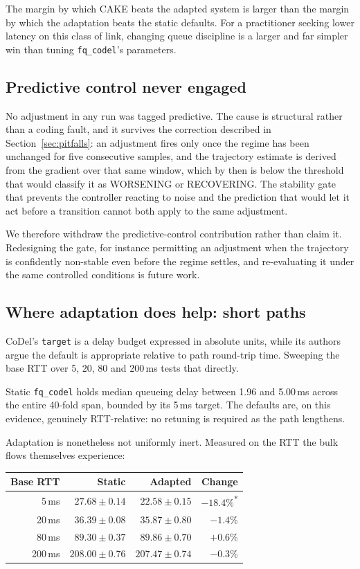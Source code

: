 The margin by which CAKE beats the adapted system is larger than the margin by
which the adaptation beats the static defaults. For a practitioner seeking
lower latency on this class of link, changing queue discipline is a larger and
far simpler win than tuning \texttt{fq\_codel}'s parameters.

\subsection{Predictive control never engaged}

No adjustment in any run was tagged predictive. The cause is structural rather
than a coding fault, and it survives the correction described in
Section~\ref{sec:pitfalls}: an adjustment fires only once the regime has been
unchanged for five consecutive samples, and the trajectory estimate is derived
from the gradient over that same window, which by then is below the threshold
that would classify it as WORSENING or RECOVERING. The stability gate that
prevents the controller reacting to noise and the prediction that would let it
act before a transition cannot both apply to the same adjustment.

We therefore withdraw the predictive-control contribution rather than claim it.
Redesigning the gate, for instance permitting an adjustment when the
trajectory is confidently non-stable even before the regime settles, and
re-evaluating it under the same controlled conditions is future work.

\subsection{Where adaptation does help: short paths}

CoDel's \texttt{target} is a delay budget expressed in absolute units, while
its authors argue the default is appropriate relative to path round-trip time.
Sweeping the base RTT over 5, 20, 80 and 200\,ms tests that directly.

Static \texttt{fq\_codel} holds median queueing delay between 1.96 and
5.00\,ms across the entire 40-fold span, bounded by its 5\,ms target. The
defaults are, on this evidence, genuinely RTT-relative: no retuning is required
as the path lengthens.

Adaptation is nonetheless not uniformly inert. Measured on the RTT the bulk
flows themselves experience:

\begin{center}
\begin{tabular}{rrrr}
\toprule
\textbf{Base RTT} & \textbf{Static} & \textbf{Adapted} & \textbf{Change} \\
\midrule
5\,ms   & $27.68 \pm 0.14$  & $22.58 \pm 0.15$  & $-18.4\%$\textsuperscript{*} \\
20\,ms  & $36.39 \pm 0.08$  & $35.87 \pm 0.80$  & $-1.4\%$ \\
80\,ms  & $89.30 \pm 0.37$  & $89.86 \pm 0.70$  & $+0.6\%$ \\
200\,ms & $208.00 \pm 0.76$ & $207.47 \pm 0.74$ & $-0.3\%$ \\
\bottomrule
\end{tabular}
\end{center}

